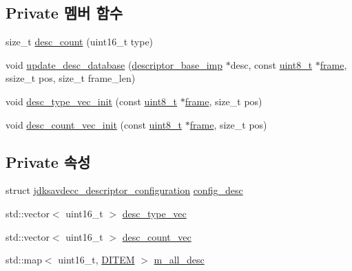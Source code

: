\subsection*{Private 멤버 함수}
\begin{DoxyCompactItemize}
\item 
size\+\_\+t \hyperlink{classavdecc__lib_1_1configuration__descriptor__imp_aa8f933a843d9c82d26c53ea90f5010ed}{desc\+\_\+count} (uint16\+\_\+t type)
\item 
void \hyperlink{classavdecc__lib_1_1configuration__descriptor__imp_a98445251711b644b6da09d2354003778}{update\+\_\+desc\+\_\+database} (\hyperlink{classavdecc__lib_1_1descriptor__base__imp}{descriptor\+\_\+base\+\_\+imp} $\ast$desc, const \hyperlink{stdint_8h_aba7bc1797add20fe3efdf37ced1182c5}{uint8\+\_\+t} $\ast$\hyperlink{gst__avb__playbin_8c_ac8e710e0b5e994c0545d75d69868c6f0}{frame}, ssize\+\_\+t pos, size\+\_\+t frame\+\_\+len)
\item 
void \hyperlink{classavdecc__lib_1_1configuration__descriptor__imp_a3e6b5d18a85f706ac26d2e242a561a96}{desc\+\_\+type\+\_\+vec\+\_\+init} (const \hyperlink{stdint_8h_aba7bc1797add20fe3efdf37ced1182c5}{uint8\+\_\+t} $\ast$\hyperlink{gst__avb__playbin_8c_ac8e710e0b5e994c0545d75d69868c6f0}{frame}, size\+\_\+t pos)
\item 
void \hyperlink{classavdecc__lib_1_1configuration__descriptor__imp_ae128bade39748054ffb47c4739b942e8}{desc\+\_\+count\+\_\+vec\+\_\+init} (const \hyperlink{stdint_8h_aba7bc1797add20fe3efdf37ced1182c5}{uint8\+\_\+t} $\ast$\hyperlink{gst__avb__playbin_8c_ac8e710e0b5e994c0545d75d69868c6f0}{frame}, size\+\_\+t pos)
\end{DoxyCompactItemize}
\subsection*{Private 속성}
\begin{DoxyCompactItemize}
\item 
struct \hyperlink{structjdksavdecc__descriptor__configuration}{jdksavdecc\+\_\+descriptor\+\_\+configuration} \hyperlink{classavdecc__lib_1_1configuration__descriptor__imp_add7ee36d1dead13df0118489cfb12471}{config\+\_\+desc}
\item 
std\+::vector$<$ uint16\+\_\+t $>$ \hyperlink{classavdecc__lib_1_1configuration__descriptor__imp_a2b2c674b5d4ca35daefae2f7c998cce5}{desc\+\_\+type\+\_\+vec}
\item 
std\+::vector$<$ uint16\+\_\+t $>$ \hyperlink{classavdecc__lib_1_1configuration__descriptor__imp_a84f7c367991701dbae62134b0526e9d5}{desc\+\_\+count\+\_\+vec}
\item 
std\+::map$<$ uint16\+\_\+t, \hyperlink{classavdecc__lib_1_1configuration__descriptor__imp_adc1ad76704bd31cdc58e35393c68070c}{D\+I\+T\+EM} $>$ \hyperlink{classavdecc__lib_1_1configuration__descriptor__imp_a5f5e2579d9278982e182299588a710ff}{m\+\_\+all\+\_\+desc}
\end{DoxyCompactItemize}



